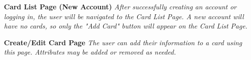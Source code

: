 \documentclass[12pt]{article}%
\begin{document}
\begin{center}
    \clearpage
    {\bf \Large Card List Page (New Account)}
    {\it After successfully creating an account or logging in, the user will be navigated to the Card List Page. A new account will have no cards, so only the "Add Card" button will appear on the Card List Page.}
    
    \clearpage
    {\bf \Large Create/Edit Card Page}
    {\it The user can add their information to a card using this page. Attributes may be added or removed as needed.}
    

\end{center}
\end{document}
